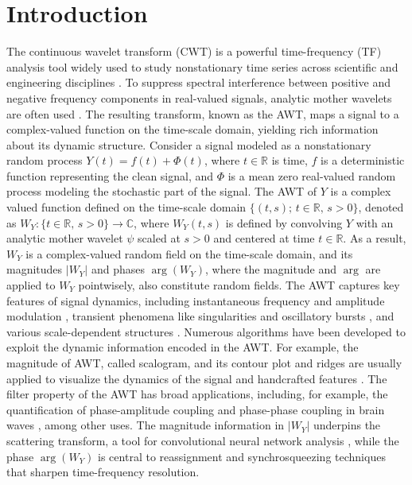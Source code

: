 \documentclass{amsart}
\begin{document}
\section{Introduction}
The continuous wavelet transform (CWT) is a powerful time-frequency (TF) analysis tool widely used to study nonstationary time series across scientific and engineering disciplines \cite{daubechies1992ten,flandrin1998time,flandrin2018explorations,mallat1999wavelet}. To suppress spectral interference between positive and negative frequency components in real-valued signals, analytic mother wavelets are often used \cite{carmona1997characterization,delprat1992asymptotic,holighaus2019characterization,lilly2010analytic,meynard2018spectral}. The resulting transform, known as the AWT, maps a signal to a complex-valued function on the time-scale domain, yielding rich information about its dynamic structure.
Consider a signal modeled as a nonstationary random process $Y(t)=f(t)+\Phi(t)$, where $t\in \mathbb{R}$ is time, $f$ is a deterministic function representing the clean signal, and $\Phi$ is a mean zero real-valued random process modeling the stochastic part of the signal. The AWT of $Y$ is a complex valued function defined on the time-scale domain $\{(t,s);\,t\in \mathbb{R},\,s>0\}$, denoted as $W_{Y}:\{t\in \mathbb{R},\,s>0\}\to \mathbb{C}$, where $W_Y(t,s)$ is defined by convolving $Y$ with an analytic mother wavelet $\psi$ scaled at $s>0$ and centered at time $t\in \mathbb{R}$.
As a result, $W_{Y}$ is a complex-valued random field on the time-scale domain, and its magnitudes $|W_{Y}|$ and phases $\arg(W_{Y})$, where the magnitude and $\arg$ are applied to $W_Y$ pointwisely, also constitute random fields.
The AWT captures key features of signal dynamics, including instantaneous frequency and amplitude modulation \cite{delprat1992asymptotic}, transient phenomena like singularities and oscillatory bursts  \cite{daubechies1992ten}, and various scale-dependent structures \cite{jaffard1996wavelet}.
Numerous algorithms have been developed to exploit the dynamic information encoded in the AWT. For example, the magnitude of AWT, called scalogram, and its contour plot and ridges are usually applied to visualize the dynamics of the signal and handcrafted features \cite{mallat1999wavelet,mallat2002singularity,lilly2010analytic}.
The filter property of the AWT has broad applications, including, for example, the quantification of phase-amplitude coupling and phase-phase coupling in brain waves \cite{tort2010measuring,hulsemann2019quantification}, among other uses. The magnitude information in $|W_Y|$ underpins the scattering transform, a tool for convolutional neural network analysis \cite{mallat2012group,bruna2015intermittent}, while the phase  $\arg(W_{Y})$ is central to reassignment \cite{auger2002improving} and synchrosqueezing \cite{2011synchrosqueezed} techniques that sharpen time-frequency resolution.
\end{document}

